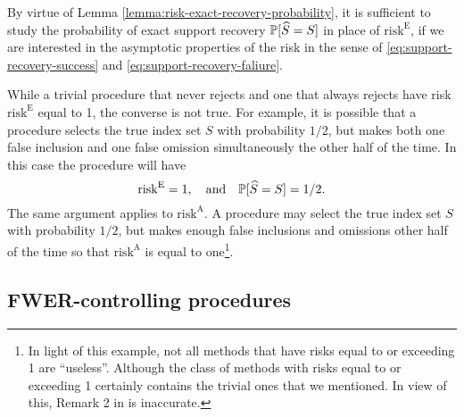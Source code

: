 \begin{remark}
By virtue of Lemma \ref{lemma:risk-exact-recovery-probability}, it is sufficient to study the probability of exact support recovery $\P[\widehat{S}=S]$ in place of $\mathrm{risk}^{\mathrm{E}}$, if we are interested in the asymptotic properties of the risk in the sense of \eqref{eq:support-recovery-success} and \eqref{eq:support-recovery-faliure}.
\end{remark}

\begin{remark} \label{rmk:asymptotic-risks}
While a trivial procedure that never rejects and one that always rejects have risk $\mathrm{risk}^{\mathrm{E}}$ equal to 1, the converse is not true.
For example, it is possible that a procedure selects the true index set $S$ with probability $1/2$, but makes both one false inclusion and one false omission simultaneously the other half of the time. 
In this case the procedure will have 
$$\mathrm{risk}^{\mathrm{E}} = 1, \quad \text{and} \quad \P[\widehat{S}=S] = 1/2.$$
The same argument applies to $\mathrm{risk}^{\mathrm{A}}$. 
A procedure may select the true index set $S$ with probability $1/2$, but makes enough false inclusions and omissions other half of the time so that $\mathrm{risk}^{\mathrm{A}}$ is equal to one\footnote{In light of this example, not all methods that have risks equal to or exceeding 1 are ``useless''.
Although the class of methods with risks equal to or exceeding 1 certainly contains the trivial ones that we mentioned.
In view of this, Remark 2 in \cite{arias2017distribution} is inaccurate.}.
\end{remark}


\subsection{FWER-controlling procedures}
\label{subsec:FWER-controlling-procedures}

